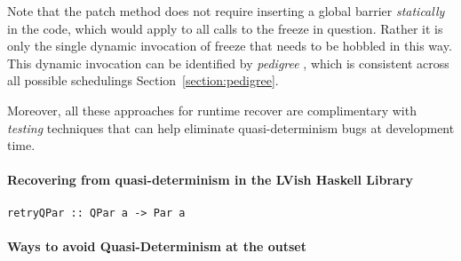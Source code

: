 Note that the patch method does not require inserting a global barrier {\em
  statically} in the code, which would apply to all calls to the freeze in
question.  Rather it is only the single dynamic invocation of freeze that needs
to be hobbled in this way.  This dynamic invocation can be identified by {\em
  pedigree} \cite{cilk-pedigree}, which is consistent across all possible
schedulings Section~\ref{section:pedigree}.

Moreover, all these approaches for runtime recover are complimentary with {\em
  testing} techniques that can help eliminate quasi-determinism bugs at
development time. 


\paragraph{Recovering from quasi-determinism in the LVish Haskell Library}

\begin{lstlisting}
retryQPar :: QPar a -> Par a
\end{lstlisting}

\paragraph{Ways to avoid Quasi-Determinism at the outset}
